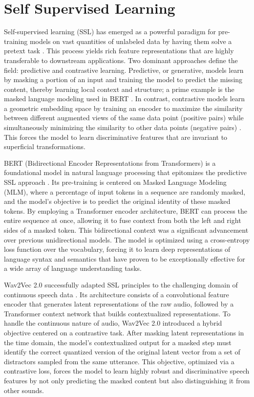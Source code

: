 \documentclass{report}
\begin{document}
\section{Self Supervised Learning}
\label{sec:self_supervised_learning}
Self-supervised learning (SSL) has emerged as a powerful paradigm for pre-training models on vast quantities of unlabeled data by having them solve a pretext task \citep{balestriero2023cookbookselfsupervisedlearning}. This process yields rich feature representations that are highly transferable to downstream applications. Two dominant approaches define the field: predictive and contrastive learning. Predictive, or generative, models learn by masking a portion of an input and training the model to predict the missing content, thereby learning local context and structure; a prime example is the masked language modeling used in BERT \citep{devlin2019bertpretrainingdeepbidirectional}. In contrast, contrastive models learn a geometric embedding space by training an encoder to maximize the similarity between different augmented views of the same data point (positive pairs) while simultaneously minimizing the similarity to other data points (negative pairs) \citep{chen2020simpleframeworkcontrastivelearning}. This forces the model to learn discriminative features that are invariant to superficial transformations.

BERT (Bidirectional Encoder Representations from Transformers) is a foundational model in natural language processing that epitomizes the predictive SSL approach \citep{devlin2019bertpretrainingdeepbidirectional}. Its pre-training is centered on Masked Language Modeling (MLM), where a percentage of input tokens in a sequence are randomly masked, and the model's objective is to predict the original identity of these masked tokens. By employing a Transformer encoder architecture, BERT can process the entire sequence at once, allowing it to fuse context from both the left and right sides of a masked token. This bidirectional context was a significant advancement over previous unidirectional models. The model is optimized using a cross-entropy loss function over the vocabulary, forcing it to learn deep representations of language syntax and semantics that have proven to be exceptionally effective for a wide array of language understanding tasks.

Wav2Vec 2.0 successfully adapted SSL principles to the challenging domain of continuous speech data \citep{baevski2020wav2vec20frameworkselfsupervised}. Its architecture consists of a convolutional feature encoder that generates latent representations of the raw audio, followed by a Transformer context network that builds contextualized representations. To handle the continuous nature of audio, Wav2Vec 2.0 introduced a hybrid objective centered on a contrastive task. After masking latent representations in the time domain, the model's contextualized output for a masked step must identify the correct quantized version of the original latent vector from a set of distractors sampled from the same utterance. This objective, optimized via a contrastive loss, forces the model to learn highly robust and discriminative speech features by not only predicting the masked content but also distinguishing it from other sounds.
\end{document}
